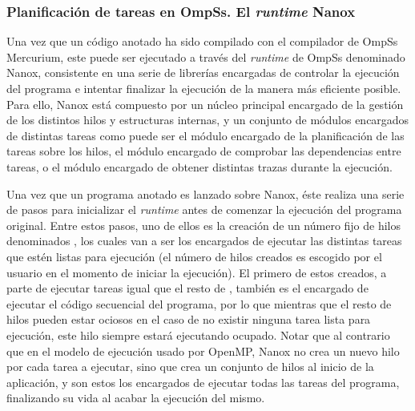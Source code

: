 \subsubsection{Planificación de tareas en OmpSs. El \emph{runtime} Nanox}

Una vez que un código anotado ha sido compilado con el compilador de OmpSs
Mercurium, este puede ser ejecutado a través del \emph{runtime} de OmpSs
denominado Nanox, consistente en una serie de librerías encargadas de
controlar la ejecución del programa e intentar finalizar la ejecución de la
manera más eficiente posible. Para ello, Nanox está compuesto por un núcleo
principal encargado de la gestión de los distintos hilos y estructuras
internas, y un conjunto de módulos encargados de distintas tareas como
puede ser el módulo encargado de la planificación de las tareas sobre los
hilos, el módulo encargado de comprobar las dependencias entre tareas, o el
módulo encargado de obtener distintas trazas durante la ejecución.

Una vez que un programa anotado es lanzado sobre Nanox, éste realiza una
serie de pasos para inicializar el \emph{runtime} antes de comenzar la
ejecución del programa original. Entre estos pasos, uno de ellos es la
creación de un número fijo de hilos denominados \wts, los cuales van a ser
los encargados de ejecutar las distintas tareas que estén listas para
ejecución (el número de hilos creados es escogido por el usuario en el
momento de iniciar la ejecución). El primero de estos \wts creados, a parte
de ejecutar tareas igual que el resto de \wts, también es el encargado de
ejecutar el código secuencial del programa, por lo que mientras que el
resto de hilos pueden estar ociosos en el caso de no existir ninguna tarea
lista para ejecución, este hilo siempre estará ejecutando ocupado. Notar
que al contrario que en el modelo de ejecución usado por OpenMP, Nanox no
crea un nuevo hilo por cada tarea a ejecutar, sino que crea un conjunto de
hilos al inicio de la aplicación, y son estos los encargados de ejecutar
todas las tareas del programa, finalizando su vida al acabar la ejecución
del mismo.

